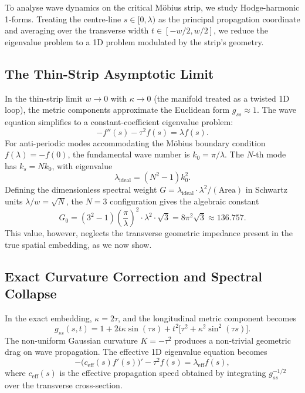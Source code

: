 \documentclass[11pt,a4paper]{article}
\begin{document}
To analyse wave dynamics on the critical M\"obius strip, we study Hodge-harmonic 1-forms. Treating the centre-line $s \in [0, \lambda)$ as the principal propagation coordinate and averaging over the transverse width $t \in [-w/2, w/2]$, we reduce the eigenvalue problem to a 1D problem modulated by the strip's geometry.

\subsection{The Thin-Strip Asymptotic Limit}
In the thin-strip limit $w \to 0$ with $\kappa \to 0$ (the manifold treated as a twisted 1D loop), the metric components approximate the Euclidean form $g_{ss} \approx 1$. The wave equation simplifies to a constant-coefficient eigenvalue problem:
\begin{equation}
-f''(s) - \tau^2 f(s) = \lambda f(s).
\end{equation}
For anti-periodic modes accommodating the M\"obius boundary condition $f(\lambda) = -f(0)$, the fundamental wave number is $k_0 = \pi/\lambda$. The $N$-th mode has $k_s = N k_0$, with eigenvalue
\begin{equation}
\lambda_{\text{ideal}} = (N^2 - 1)k_0^2.
\end{equation}
Defining the dimensionless spectral weight $G = \lambda_{\text{ideal}} \cdot \lambda^2 / (\text{Area})$ in Schwartz units $\lambda/w = \sqrt{N}$, the $N=3$ configuration gives the algebraic constant
\begin{equation}
G_0 = (3^2 - 1)\!\left(\frac{\pi}{\lambda}\right)^2\!\cdot \lambda^2 \cdot \sqrt{3} = 8\pi^2\sqrt{3} \approx 136.757.
\end{equation}
This value, however, neglects the transverse geometric impedance present in the true spatial embedding, as we now show.

\subsection{Exact Curvature Correction and Spectral Collapse}
In the exact embedding, $\kappa = 2\tau$, and the longitudinal metric component becomes
\begin{equation}
g_{ss}(s,t) = 1 + 2t\kappa \sin(\tau s) + t^2\big[\tau^2 + \kappa^2 \sin^2(\tau s)\big].
\end{equation}
The non-uniform Gaussian curvature $K = -\tau^2$ produces a non-trivial geometric drag on wave propagation. The effective 1D eigenvalue equation becomes
\begin{equation}
-\big(c_{\text{eff}}(s)f'(s)\big)' - \tau^2 f(s) = \lambda_{\text{eff}} f(s),
\end{equation}
where $c_{\text{eff}}(s)$ is the effective propagation speed obtained by integrating $g_{ss}^{-1/2}$ over the transverse cross-section.
\end{document}
